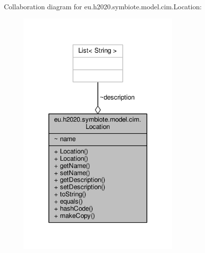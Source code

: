 Collaboration diagram for eu.\+h2020.\+symbiote.\+model.\+cim.\+Location\+:
\nopagebreak
\begin{figure}[H]
\begin{center}
\leavevmode
\includegraphics[width=228pt]{classeu_1_1h2020_1_1symbiote_1_1model_1_1cim_1_1Location__coll__graph}
\end{center}
\end{figure}
